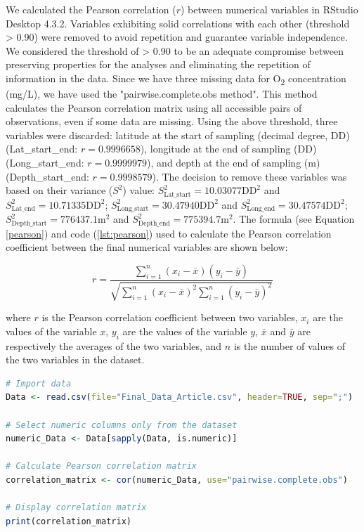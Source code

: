 We calculated the Pearson correlation ($r$) between numerical variables in RStudio Desktop 4.3.2. Variables exhibiting solid correlations with each other (threshold > 0.90) were removed to avoid repetition and guarantee variable independence. We considered the threshold of > 0.90 to be an adequate compromise between preserving properties for the analyses and eliminating the repetition of information in the data. Since we have three missing data for O\textsubscript{2} concentration (mg/L), we have used the "pairwise.complete.obs method". This method calculates the Pearson correlation matrix using all accessible pairs of observations, even if some data are missing. Using the above threshold, three variables were discarded: latitude at the start of sampling (decimal degree, DD) (Lat_start_end: $r = 0.9996658$), longitude at the end of sampling (DD) (Long_start_end: $r = 0.9999979$), and depth at the end of sampling (m) (Depth_start_end: $r = 0.9998579$). The decision to remove these variables was based on their variance ($S^2$) value: $S^2_\text{Lat\_start} = 10.03077 \text{DD}^2$ and $S^2_\text{Lat\_end} = 10.71335 \text{DD}^2$; $S^2_\text{Long\_start} = 30.47940 \text{DD}^2$ and $S^2_\text{Long\_end} = 30.47574 \text{DD}^2$; $S^2_\text{Depth\_start} = 776437.1 \text{m}^2$ and $S^2_\text{Depth\_end} = 775394.7 \text{m}^2$. The formula (see Equation \ref{pearson}) and code (\autoref{lst:pearson}) used to calculate the Pearson correlation coefficient between the final numerical variables are shown below:

\begin{equation}\label{pearson}
    r = \frac{\sum_{i=1}^{n} (x_i - \bar{x})(y_i - \bar{y})}{\sqrt{\sum_{i=1}^{n} (x_i - \bar{x})^2 \sum_{i=1}^{n} (y_i - \bar{y})^2}}
\end{equation}

where $r$ is the Pearson correlation coefficient between two variables, $x_i$ are the values of the variable $x$, $y_i$ are the values of the variable $y$, $\bar{x}$ and $\bar{y}$ are respectively the averages of the two variables, and $n$ is the number of values of the two variables in the dataset.

\begin{lstlisting}[label=lst:pearson,language=R,caption=RStudio script to calculate the Pearson correlation coefficient between all the numerical variables in the final dataset.]
# Import data
Data <- read.csv(file="Final_Data_Article.csv", header=TRUE, sep=";")

# Select numeric columns only from the dataset
numeric_Data <- Data[sapply(Data, is.numeric)]

# Calculate Pearson correlation matrix
correlation_matrix <- cor(numeric_Data, use="pairwise.complete.obs")

# Display correlation matrix
print(correlation_matrix)
\end{lstlisting}

